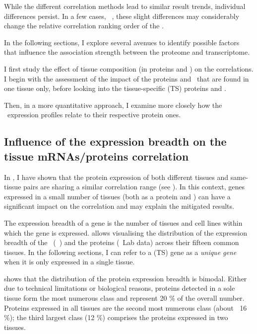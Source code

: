 While the different correlation methods lead to similar result trends,
individual differences persist.
In a few cases, \eg\ \heart,
these slight differences may considerably change
the relative correlation ranking order of the \treps{}.\mybr\

In the following sections,
I explore several avenues to identify possible factors
that influence the association strength
between the proteome and transcriptome.\mybr\

I first study the effect of tissue composition (in proteins and \mRNAs)
on the correlations.
I begin with the assessment of the impact of the proteins and \mRNAs\
that are found in one tissue only,
before looking into the tissue-specific (\gls{TS}) proteins and \mRNAs{}.\mybr\

Then, in a more quantitative approach,
I examine more closely how the \mRNA\ expression profiles relate
to their respective protein ones.\mybr\

\subsection{Influence of the expression breadth on the tissue %
\texorpdfstring{\MakeLowercase{m}RNAs/proteins}{mRNAs/proteins} correlation}

In ,
I have shown that
the protein expression of both different tissues and same-tissue pairs
are sharing a similar correlation range
(see ).
In this context,
genes expressed in a small number of tissues
(both as a protein and \mRNA)
can have a significant impact on the correlation
and may explain the mitigated results.\mybr\

The expression breadth of a gene is
the number of tissues and cell lines within which the gene is expressed.
\Cref{fig:expressionBreadth} allows visualising
the distribution of the expression breadth of the \mRNAs\ (\uhlen\ \etal)
and the proteins (\pandey\ Lab data) across their fifteen common tissues.
In the following sections,
I can refer to a (\gls{TS}) gene as a \emph{unique gene}
when it is only expressed in a single tissue.\mybr\

 shows that
the distribution of the protein expression breadth is bimodal.
Either due to technical limitations or biological reasons,
proteins detected in a sole tissue form
the most numerous class and represent 20 \% of the overall number.
Proteins expressed in all tissues are the second most numerous class (about $~$ 16 \%);
the third largest class (12 \%) comprises the proteins expressed in two tissues.\mybr\

